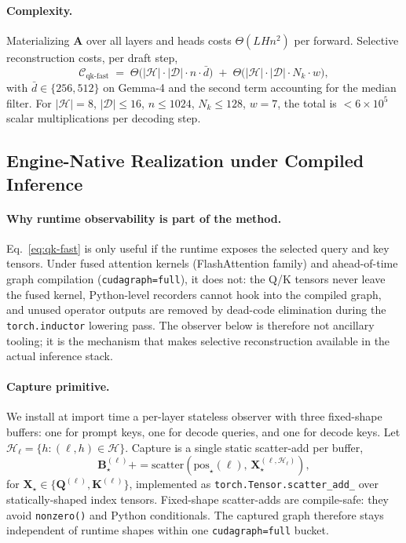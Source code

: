 \documentclass[11pt,twocolumn]{article}
\begin{document}
\paragraph{Complexity.}
Materializing $\mathbf{A}$ over all layers and heads costs
$\Theta(LHn^2)$ per forward.
Selective reconstruction costs, per draft step,
\begin{equation}
  \mathcal{C}_{\text{qk-fast}}
  \;=\;
  \Theta\!\bigl(|\mathcal{H}| \cdot |\mathcal{D}| \cdot n \cdot \bar{d}\bigr)
  \;+\;
  \Theta\!\bigl(|\mathcal{H}| \cdot |\mathcal{D}| \cdot N_k \cdot w\bigr),
  \label{eq:complexity}
\end{equation}
with $\bar{d} \in \{256, 512\}$ on Gemma-4 and the second term accounting for
the median filter. For $|\mathcal{H}|{=}8$, $|\mathcal{D}|{\leq}16$,
$n{\leq}1024$, $N_k{\leq}128$, $w{=}7$, the total is
$< 6 \times 10^5$ scalar multiplications per decoding step.

\subsection{Engine-Native Realization under Compiled Inference}

\paragraph{Why runtime observability is part of the method.}
Eq.~\eqref{eq:qk-fast} is only useful if the runtime exposes the selected
query and key tensors. Under fused attention kernels (FlashAttention family)
and ahead-of-time graph compilation (\texttt{cudagraph=full}), it does not:
the Q/K tensors never leave the fused kernel, Python-level recorders cannot
hook into the compiled graph, and unused operator outputs are removed by
dead-code elimination during the \texttt{torch.inductor} lowering pass. The
observer below is therefore not ancillary tooling; it is the mechanism that
makes selective reconstruction available in the actual inference stack.

\paragraph{Capture primitive.}
We install at import time a per-layer stateless observer with three
fixed-shape buffers: one for prompt keys, one for decode queries, and one for
decode keys. Let $\mathcal{H}_\ell = \{h : (\ell,h) \in \mathcal{H}\}$.
Capture is a single static scatter-add per buffer,
\begin{equation}
  \mathbf{B}^{(\ell)}_{\star} \mathrel{+\!\!=} \mathrm{scatter}\!\left(
    \mathrm{pos}_{\star}(\ell),\, \mathbf{X}^{(\ell, \mathcal{H}_\ell)}_{\star}
  \right),
  \label{eq:scatter}
\end{equation}
for $\mathbf{X}_\star \in \{\mathbf{Q}^{(\ell)}, \mathbf{K}^{(\ell)}\}$,
implemented as \texttt{torch.Tensor.scatter\_add\_} over statically-shaped
index tensors. Fixed-shape scatter-adds are compile-safe: they avoid
\texttt{nonzero()} and Python conditionals. The captured graph therefore stays
independent of runtime shapes within one \texttt{cudagraph=full} bucket.
\end{document}
